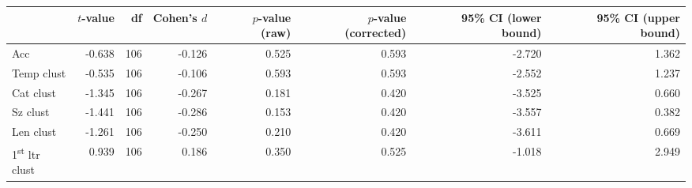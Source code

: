 \begin{tabular}{lrrrrrrr}
\toprule
{} & $t$-value &  df & Cohen's $d$ & $p$-value (raw) & $p$-value (corrected) & 95\% CI (lower bound) & 95\% CI (upper bound) \\
\midrule
Acc                             &    -0.638 & 106 &      -0.126 &           0.525 &                 0.593 &                -2.720 &                 1.362 \\
Temp clust                      &    -0.535 & 106 &      -0.106 &           0.593 &                 0.593 &                -2.552 &                 1.237 \\
Cat clust                       &    -1.345 & 106 &      -0.267 &           0.181 &                 0.420 &                -3.525 &                 0.660 \\
Sz clust                        &    -1.441 & 106 &      -0.286 &           0.153 &                 0.420 &                -3.557 &                 0.382 \\
Len clust                       &    -1.261 & 106 &      -0.250 &           0.210 &                 0.420 &                -3.611 &                 0.669 \\
1\textsuperscript{st} ltr clust &     0.939 & 106 &       0.186 &           0.350 &                 0.525 &                -1.018 &                 2.949 \\
\bottomrule
\end{tabular}
